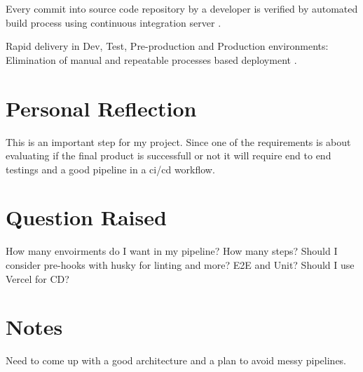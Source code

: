 Every commit into source code repository by a developer is verified by automated
build process using continuous integration server \citep{soniEndEndAutomation2015}.

Rapid delivery in Dev, Test, Pre-production and Production environments:
Elimination of manual and repeatable processes based deployment \citep{soniEndEndAutomation2015}.

\section{Personal Reflection}
\label{s:Personal-Reflection-5}
This is an important step for my project. Since one of the requirements is about
evaluating if the final product is successfull or not it will require end to end
testings and a good pipeline in a ci/cd workflow.

\section{Question Raised}
\label{s:Question-Raised-5}
How many envoirments do I want in my pipeline? How many steps?
Should I consider pre-hooks with husky for linting and more? E2E and Unit?
Should I use Vercel for CD?

\section{Notes}
\label{s:Notes-5}
Need to come up with a good architecture and a plan to avoid messy pipelines.
